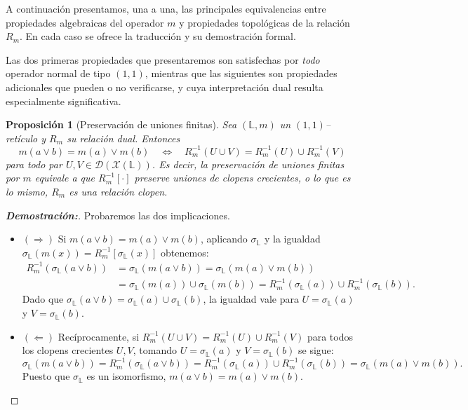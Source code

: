 \documentclass[12pt]{book}
\newtheorem{proposition}[theorem]{Proposición}
\begin{document}
A continuación presentamos, una a una, las principales equivalencias
entre propiedades algebraicas del operador $m$ y propiedades topológicas
de la relación $R_m$.
En cada caso se ofrece la traducción y su demostración formal.

Las dos primeras propiedades que presentaremos son satisfechas por \emph{todo} operador normal de tipo $(1,1)$, mientras que las siguientes son propiedades adicionales que pueden o no verificarse, y cuya interpretación dual resulta especialmente significativa.


\begin{proposition}[Preservación de uniones finitas]
Sea $(\mathbb{L},m)$ un $(1,1)$–retículo y $R_m$ su relación dual. Entonces
\[
m(a\vee b)=m(a)\vee m(b)
\quad\Longleftrightarrow\quad
R_m^{-1}(U\cup V)=R_m^{-1}(U)\cup R_m^{-1}(V)
\]
para todo par $U,V\in \mathcal{D}(\mathcal{X}(\mathbb{L}))$. Es decir, la preservación de uniones finitas por $m$
equivale a que $R_m^{-1}[\cdot]$ preserve uniones de clopens crecientes, o lo que es lo mismo, $R_m$ es una relación clopen.
\end{proposition}

\begin{proof}[{\textbf{Demostración:}}] Probaremos las dos implicaciones.

\begin{itemize}
    \item $(\Rightarrow)$
Si $m(a\vee b)=m(a)\vee m(b)$, aplicando $\sigma_{\mathbb{L}}$ y la igualdad
$\sigma_{\mathbb{L}}(m(x))=R_m^{-1}[\sigma_{\mathbb{L}}(x)]$ obtenemos:
\begin{align*}
R_m^{-1}(\sigma_{\mathbb{L}}(a\vee b))
&=\sigma_{\mathbb{L}}(m(a\vee b))
=\sigma_{\mathbb{L}}(m(a)\vee m(b))\\
&=\sigma_{\mathbb{L}}(m(a))\cup\sigma_{\mathbb{L}}(m(b))
=R_m^{-1}(\sigma_{\mathbb{L}}(a))\cup R_m^{-1}(\sigma_{\mathbb{L}}(b)).
\end{align*}
Dado que $\sigma_{\mathbb{L}}(a\vee b)=\sigma_{\mathbb{L}}(a)\cup\sigma_{\mathbb{L}}(b)$, la igualdad vale para
$U=\sigma_{\mathbb{L}}(a)$ y $V=\sigma_{\mathbb{L}}(b)$.

\item $(\Leftarrow)$
Recíprocamente, si $R_m^{-1}(U\cup V)=R_m^{-1}(U)\cup R_m^{-1}(V)$
para todos los clopens crecientes $U,V$, tomando
$U=\sigma_{\mathbb{L}}(a)$ y $V=\sigma_{\mathbb{L}}(b)$ se sigue:
\[
\sigma_{\mathbb{L}}(m(a\vee b))
=R_m^{-1}(\sigma_{\mathbb{L}}(a\vee b))
=R_m^{-1}(\sigma_{\mathbb{L}}(a))\cup R_m^{-1}(\sigma_{\mathbb{L}}(b))
=\sigma_{\mathbb{L}}(m(a)\vee m(b)).
\]
Puesto que $\sigma_{\mathbb{L}}$ es un isomorfismo, $m(a\vee b)=m(a)\vee m(b)$.
\end{itemize}
\end{proof}
\end{document}
